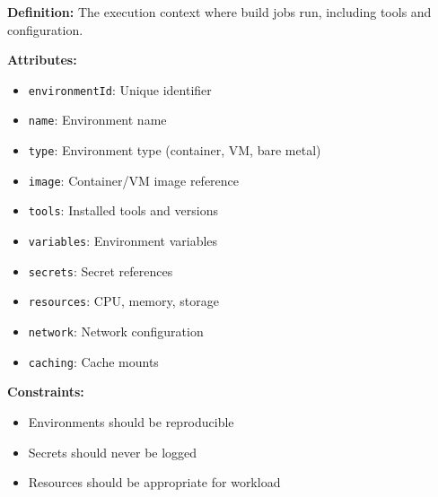 \documentclass[11pt,letterpaper]{article}
\begin{document}
\begin{definitionbox}
\textbf{Definition:} The execution context where build jobs run, including tools and configuration.

\textbf{Attributes:}
\begin{itemize}[nosep]
    \item \texttt{environmentId}: Unique identifier
    \item \texttt{name}: Environment name
    \item \texttt{type}: Environment type (container, VM, bare metal)
    \item \texttt{image}: Container/VM image reference
    \item \texttt{tools}: Installed tools and versions
    \item \texttt{variables}: Environment variables
    \item \texttt{secrets}: Secret references
    \item \texttt{resources}: CPU, memory, storage
    \item \texttt{network}: Network configuration
    \item \texttt{caching}: Cache mounts
\end{itemize}

\textbf{Constraints:}
\begin{itemize}[nosep]
    \item Environments should be reproducible
    \item Secrets should never be logged
    \item Resources should be appropriate for workload
\end{itemize}
\end{definitionbox}
\end{document}
